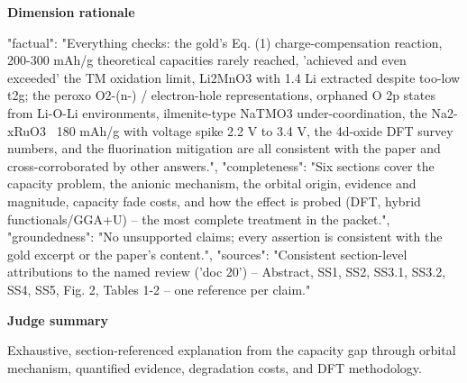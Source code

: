 \documentclass[10pt]{article}
\begin{document}
\textbf{Dimension rationale}
\begin{EvidenceText}
{
  "factual": "Everything checks: the gold's Eq. (1) charge-compensation reaction, 200-300 mAh/g theoretical capacities rarely reached, 'achieved and even exceeded' the TM oxidation limit, Li2MnO3 with 1.4 Li extracted despite too-low t2g; the peroxo O2-(n-) / electron-hole representations, orphaned O 2p states from Li-O-Li environments, ilmenite-type NaTMO3 under-coordination, the Na2-xRuO3 ~180 mAh/g with voltage spike 2.2 V to 3.4 V, the 4d-oxide DFT survey numbers, and the fluorination mitigation are all consistent with the paper and cross-corroborated by other answers.",
  "completeness": "Six sections cover the capacity problem, the anionic mechanism, the orbital origin, evidence and magnitude, capacity fade costs, and how the effect is probed (DFT, hybrid functionals/GGA+U) -- the most complete treatment in the packet.",
  "groundedness": "No unsupported claims; every assertion is consistent with the gold excerpt or the paper's content.",
  "sources": "Consistent section-level attributions to the named review ('doc 20') -- Abstract, SS1, SS2, SS3.1, SS3.2, SS4, SS5, Fig. 2, Tables 1-2 -- one reference per claim."
}
\end{EvidenceText}

\textbf{Judge summary}
\begin{EvidenceText}
Exhaustive, section-referenced explanation from the capacity gap through orbital mechanism, quantified evidence, degradation costs, and DFT methodology.
\end{EvidenceText}
\end{document}
